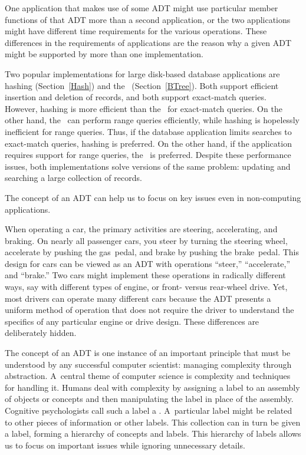 One application that makes use of some ADT might use particular
member functions of that ADT more than a second application, or the
two applications might have different time requirements for the
various operations.
These differences in the requirements of applications are the reason
why a given ADT might be supported by more than one implementation.

\begin{example}
Two popular implementations for large disk-based database applications
are hashing (Section~\ref{Hash}) and the
\BPtree\ (Section~\ref{BTree}).
Both support efficient insertion and deletion of records, and both
support exact-match queries.
However, hashing is more efficient than the \BPtree\ for
exact-match queries.
On the other hand, the \BPtree\ can perform range queries efficiently,
while hashing is hopelessly inefficient for
range queries.
Thus, if the database application limits searches to exact-match
queries, hashing is preferred.
On the other hand, if the application requires support for range
queries, the \BPtree\ is preferred.
Despite these performance issues, both implementations solve versions
of the same problem: updating and searching a large collection of
records.
\end{example}

The concept of an ADT can help us to focus on key issues even in
non-com\-p\-ut\-ing applications.

\begin{example}
When operating a car, the primary activities are steering,
accelerating, and braking.
On nearly all passenger cars, you steer by turning the steering wheel,
accelerate by pushing the gas~pedal, and brake by pushing the
brake~pedal.
This design for cars can be viewed as an ADT with operations
``steer,'' ``accelerate,'' and ``brake.''
Two cars might implement these operations in radically different ways,
say with different types of engine, or front- versus rear-wheel drive.
Yet, most drivers can operate many different cars because the ADT
presents a uniform method of operation that does not require the
driver to understand the specifics of any particular engine or drive
design.
These differences are deliberately hidden.
\end{example}

The concept of an ADT is one instance of an
important principle that must be understood by any successful
computer scientist: managing complexity through
abstraction.
A~central theme of computer science is complexity and
techniques for handling it.
Humans deal with complexity by assigning a label to an assembly of
objects or concepts and then manipulating the label in place of the
assembly.
Cognitive psychologists call such a label a
.
A~particular label might be related to other pieces of information or
other labels.
This collection can in turn be given a label,
forming a hierarchy of concepts and labels.
This hierarchy of labels allows us to focus on
important issues while ignoring unnecessary details.

